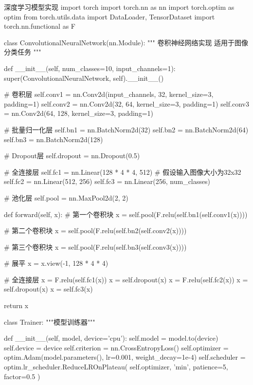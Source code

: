 \begin{longcodebox}[python]{深度学习模型实现}
import torch
import torch.nn as nn
import torch.optim as optim
from torch.utils.data import DataLoader, TensorDataset
import torch.nn.functional as F

class ConvolutionalNeuralNetwork(nn.Module):
    """
    卷积神经网络实现
    适用于图像分类任务
    """
    
    def __init__(self, num_classes=10, input_channels=1):
        super(ConvolutionalNeuralNetwork, self).__init__()
        
        # 卷积层
        self.conv1 = nn.Conv2d(input_channels, 32, kernel_size=3, padding=1)
        self.conv2 = nn.Conv2d(32, 64, kernel_size=3, padding=1)
        self.conv3 = nn.Conv2d(64, 128, kernel_size=3, padding=1)
        
        # 批量归一化层
        self.bn1 = nn.BatchNorm2d(32)
        self.bn2 = nn.BatchNorm2d(64)
        self.bn3 = nn.BatchNorm2d(128)
        
        # Dropout层
        self.dropout = nn.Dropout(0.5)
        
        # 全连接层
        self.fc1 = nn.Linear(128 * 4 * 4, 512)  # 假设输入图像大小为32x32
        self.fc2 = nn.Linear(512, 256)
        self.fc3 = nn.Linear(256, num_classes)
        
        # 池化层
        self.pool = nn.MaxPool2d(2, 2)
        
    def forward(self, x):
        # 第一个卷积块
        x = self.pool(F.relu(self.bn1(self.conv1(x))))
        
        # 第二个卷积块
        x = self.pool(F.relu(self.bn2(self.conv2(x))))
        
        # 第三个卷积块
        x = self.pool(F.relu(self.bn3(self.conv3(x))))
        
        # 展平
        x = x.view(-1, 128 * 4 * 4)
        
        # 全连接层
        x = F.relu(self.fc1(x))
        x = self.dropout(x)
        x = F.relu(self.fc2(x))
        x = self.dropout(x)
        x = self.fc3(x)
        
        return x

class Trainer:
    """模型训练器"""
    
    def __init__(self, model, device='cpu'):
        self.model = model.to(device)
        self.device = device
        self.criterion = nn.CrossEntropyLoss()
        self.optimizer = optim.Adam(model.parameters(), lr=0.001, weight_decay=1e-4)
        self.scheduler = optim.lr_scheduler.ReduceLROnPlateau(
            self.optimizer, 'min', patience=5, factor=0.5
        )
        

\end{longcodebox}
